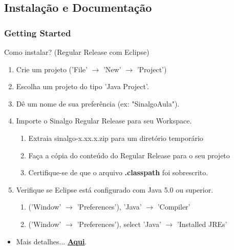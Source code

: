 \documentclass{beamer}
\begin{document}

\subsection{Instalação e Documentação} %

\begin{frame}
\frametitle{Getting Started}

\begin{alertblock}{Como instalar? (Regular Release com Eclipse)}
	\begin{enumerate}
		\item Crie um projeto ('File' $\rightarrow $ 'New' $\rightarrow $ 'Project')
		\item Escolha um projeto do tipo 'Java Project'.
		
		\item Dê um nome de sua preferência (ex: "SinalgoAula").
		
		\item Importe o Sinalgo Regular Release para seu Workspace.
		\begin{enumerate}
			\item Extraia sinalgo-x.xx.x.zip para um diretório temporário
			\item Faça a cópia do conteúdo do Regular Release para o seu projeto
			\item Certifique-se de que o arquivo \textbf{.classpath} foi sobrescrito.
		\end{enumerate}

		\item Verifique se Eclipse está configurado com Java 5.0 ou superior.
		\begin{enumerate}
			\item ('Window' $\rightarrow $ 'Preferences'), 'Java' $\rightarrow $ 'Compiler'
			\item ('Window' $\rightarrow $ 'Preferences'), select 'Java' $\rightarrow $ 'Installed JREs'
		\end{enumerate}
	\end{enumerate}
\end{alertblock}

\begin{itemize}
	\item Mais detalhes... \href{http://disco.ethz.ch/projects/sinalgo/tutorial/Installation.html}{\textbf{Aqui}}.
\end{itemize}


\end{frame}
\end{document}

